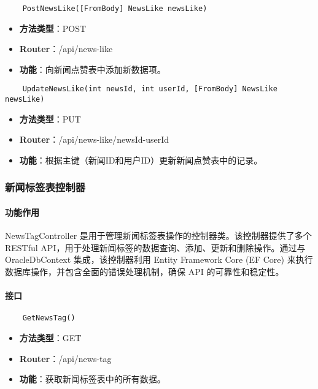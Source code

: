 \begin{verbatim}
	PostNewsLike([FromBody] NewsLike newsLike)
\end{verbatim}

\begin{itemize}
	\item \textbf{方法类型}：POST
	\item \textbf{Router}：/api/news-like
	\item \textbf{功能}：向新闻点赞表中添加新数据项。
\end{itemize}

\begin{verbatim}
	UpdateNewsLike(int newsId, int userId, [FromBody] NewsLike newsLike)
\end{verbatim}

\begin{itemize}
	\item \textbf{方法类型}：PUT
	\item \textbf{Router}：/api/news-like/{newsId}-{userId}
	\item \textbf{功能}：根据主键（新闻ID和用户ID）更新新闻点赞表中的记录。
\end{itemize}

\subsubsection{新闻标签表控制器}

\paragraph{功能作用}

NewsTagController 是用于管理新闻标签表操作的控制器类。该控制器提供了多个 RESTful API，用于处理新闻标签的数据查询、添加、更新和删除操作。通过与 OracleDbContext 集成，该控制器利用 Entity Framework Core (EF Core) 来执行数据库操作，并包含全面的错误处理机制，确保 API 的可靠性和稳定性。

\paragraph{接口}

\begin{verbatim}
	GetNewsTag()
\end{verbatim}

\begin{itemize}
	\item \textbf{方法类型}：GET
	\item \textbf{Router}：/api/news-tag
	\item \textbf{功能}：获取新闻标签表中的所有数据。
\end{itemize}

